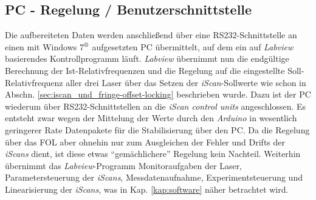 \subsection{PC - Regelung /
Benutzerschnittstelle}\label{subsec:pc_regelung_benutzerschnittstelle} Die
aufbereiteten Daten werden anschließend über eine RS232-Schnittstelle an einen mit Windows
7$^\text{\textregistered}$ aufgesetzten PC übermittelt, auf dem ein auf
\textit{Labview} basierendes Kontrollprogramm läuft. \textit{Labview} übernimmt nun die endgültige Berechnung der
Ist-Relativfrequenzen und die Regelung auf die eingestellte Soll-Relativfrequenz
aller drei Laser über das Setzen der \textit{iScan}-Sollwerte wie schon in
Abschn.
\ref{sec:iscan_und_fringe-offset-locking} beschrieben wurde.
Dazu ist der PC wiederum über RS232-Schnittstellen an die \textit{iScan control
units} angeschlossen. Es entsteht zwar wegen der Mittelung der Werte durch den
\textit{Arduino} in wesentlich geringerer Rate Datenpakete für die Stabilisierung über den PC. Da
die Regelung über das FOL aber ohnehin nur zum Ausgleichen der Fehler und Drifts
der \textit{iScans} dient, ist diese etwas "`gemächlichere"' Regelung kein
Nachteil.
Weiterhin übernimmt das \textit{Labview}-Programm Monitoraufgaben der Laser,
Parametersteuerung der \textit{iScans}, Messdatenaufnahme, Experimentsteuerung
und Linearisierung der \textit{iScans}, was in Kap. \ref{kap:software} näher
betrachtet wird.\par

